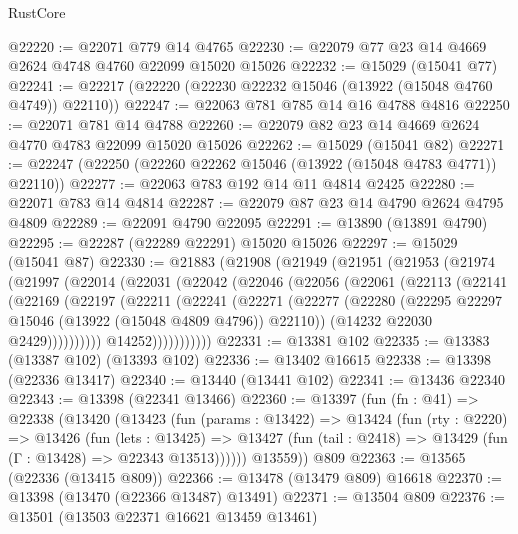 \begin{lexlean}{RustCore}
\begin{coremodule}
@22220 := @22071 @779 @14 @4765
@22230 := @22079 @77 @23 @14 @4669 @2624 @4748 @4760 @22099 @15020 @15026
@22232 := @15029 (@15041 @77)
@22241 := @22217 (@22220 (@22230 @22232 @15046 (@13922 (@15048 @4760 @4749)) @22110))
@22247 := @22063 @781 @785 @14 @16 @4788 @4816
@22250 := @22071 @781 @14 @4788
@22260 := @22079 @82 @23 @14 @4669 @2624 @4770 @4783 @22099 @15020 @15026
@22262 := @15029 (@15041 @82)
@22271 := @22247 (@22250 (@22260 @22262 @15046 (@13922 (@15048 @4783 @4771)) @22110))
@22277 := @22063 @783 @192 @14 @11 @4814 @2425
@22280 := @22071 @783 @14 @4814
@22287 := @22079 @87 @23 @14 @4790 @2624 @4795 @4809
@22289 := @22091 @4790 @22095
@22291 := @13890 (@13891 @4790)
@22295 := @22287 (@22289 @22291) @15020 @15026
@22297 := @15029 (@15041 @87)
@22330 := @21883
    (@21908
      (@21949
        (@21951
          (@21953
            (@21974
              (@21997
                (@22014
                  (@22031
                    (@22042
                      (@22046
                        (@22056
                          (@22061
                            (@22113
                              (@22141
                                (@22169
                                  (@22197
                                    (@22211
                                      (@22241
                                        (@22271
                                          (@22277
                                            (@22280
                                              (@22295
                                                @22297
                                                @15046
                                                (@13922 (@15048 @4809 @4796))
                                                @22110))
                                            (@14232 @22030 @2429))))))))))
                          @14252)))))))))))
@22331 := @13381 @102
@22335 := @13383 (@13387 @102) (@13393 @102)
@22336 := @13402 @16615
@22338 := @13398 (@22336 @13417)
@22340 := @13440 (@13441 @102)
@22341 := @13436 @22340
@22343 := @13398 (@22341 @13466)
@22360 := @13397
    (fun (fn : @41) =>
    @22338
      (@13420
        (@13423
          (fun (params : @13422) =>
          @13424
            (fun (rty : @2220) =>
            @13426
              (fun (lets : @13425) =>
              @13427 (fun (tail : @2418) => @13429 (fun (Γ : @13428) => @22343 @13513))))))
        @13559))
    @809
@22363 := @13565 (@22336 (@13415 @809))
@22366 := @13478 (@13479 @809) @16618
@22370 := @13398 (@13470 (@22366 @13487) @13491)
@22371 := @13504 @809
@22376 := @13501 (@13503 @22371 @16621 @13459 @13461)

\end{coremodule}
\end{lexlean}
